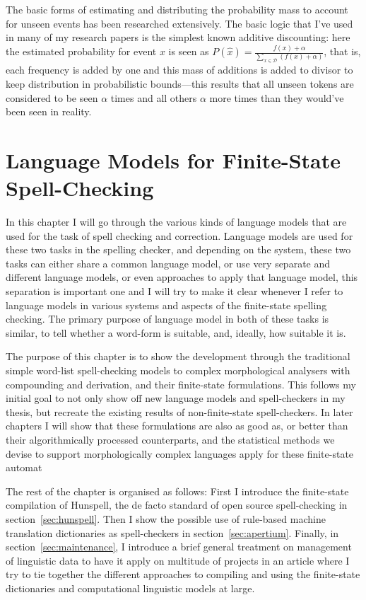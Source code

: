 \documentclass[officiallayout,draft]{unihelcompling}
\begin{document}
The basic forms of estimating and distributing the probability mass to account
for unseen events has been researched extensively. The basic logic that I've
used in many of my research papers is the simplest known additive discounting:
here the estimated probability for event $x$ is seen as 
$P(\hat{x}) = \frac{f(x) + \alpha}{\sum_{x \in \mathcal{D}}(f(x) + \alpha)}$,
that is, each frequency is added by one and this mass of additions is added to
divisor to keep distribution in probabilistic bounds---this results that all
unseen tokens are considered to be seen $\alpha$ times and all others $\alpha$
more times than they would've been seen in reality. 



\chapter{Language Models for Finite-State Spell-Checking}
\label{chap:language-models}

In this chapter I will go through the various kinds of language models that are
used for the task of spell checking and correction. Language models are used
for these two tasks in the spelling checker, and depending on the system,
these two tasks can either share a common language model, or use very
separate and different language models, or even approaches to apply that
language model, this separation is important one and I will try to make it
clear whenever I refer to language models in various systems and aspects of
the finite-state spelling checking. The primary purpose of language model in
both of these tasks is similar, to tell whether a word-form is suitable, and,
ideally, how suitable it is.

The purpose of this chapter is to show the development through the traditional
simple word-list spell-checking models to complex morphological analysers with
compounding and derivation, and their finite-state formulations. This follows
my initial goal to not only show off new language models and spell-checkers
in my thesis, but recreate the existing results of non-finite-state 
spell-checkers. In later chapters I will show that these formulations are
also as good as, or better than their algorithmically processed counterparts,
and the statistical methods we devise to support morphologically complex
languages apply for these finite-state automat 

The rest of the chapter is organised as follows: First I introduce the
finite-state compilation of Hunspell, the de facto standard of open source
spell-checking in section~\ref{sec:hunspell}.  Then I show the possible use of
rule-based machine translation dictionaries as spell-checkers in
section~\ref{sec:apertium}.  Finally, in section~\ref{sec:maintenance}, I
introduce a brief general treatment on management of linguistic data to have it
apply on multitude of projects in an article where I try to tie together the
different approaches to compiling and using the finite-state dictionaries and
computational linguistic models at large.
\end{document}
